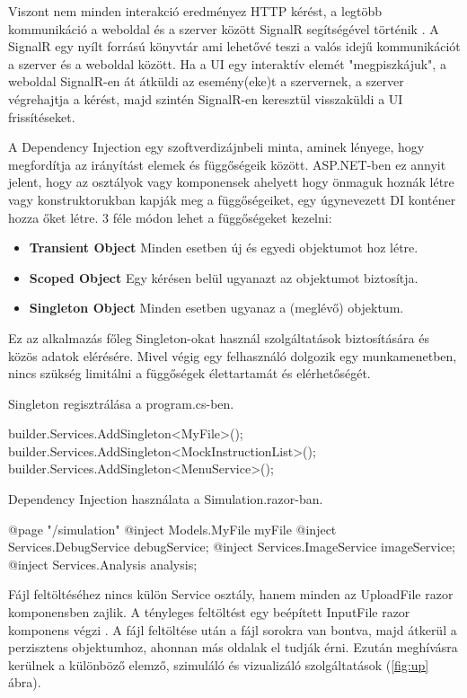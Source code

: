 Viszont nem minden interakció eredményez HTTP kérést, a legtöbb kommunikáció a weboldal és a szerver között SignalR segítségével történik \cite{signalr}. A SignalR egy nyílt forrású könyvtár ami lehetővé teszi a valós idejű kommunikációt a szerver és a weboldal között. Ha a UI egy interaktív elemét "megpiszkájuk", a weboldal SignalR-en át átküldi az esemény(eke)t a szervernek, a szerver végrehajtja a kérést, majd szintén SignalR-en keresztül visszaküldi a UI frissítéseket.

A Dependency Injection \cite{di} egy szoftverdizájnbeli minta, aminek lényege, hogy megfordítja az irányítást elemek és függőségeik között. ASP.NET-ben ez annyit jelent, hogy az osztályok vagy komponensek ahelyett hogy önmaguk hoznák létre vagy konstruktorukban kapják meg a függőségeiket, egy úgynevezett DI konténer hozza őket létre. 3 féle módon lehet a függőségeket kezelni:
\begin{itemize}
\item\textbf{Transient Object} Minden esetben új és egyedi objektumot hoz létre.
\item\textbf{Scoped Object} Egy kérésen belül ugyanazt az objektumot biztosítja.
\item\textbf{Singleton Object} Minden esetben ugyanaz a (meglévő) objektum.
\end{itemize}
Ez az alkalmazás főleg Singleton-okat használ szolgáltatások biztosítására és közös adatok elérésére. Mivel végig egy felhasználó dolgozik egy munkamenetben, nincs szükség limitálni a függőségek élettartamát és elérhetőségét.

Singleton regisztrálása a program.cs-ben.
\begin{cpp}
builder.Services.AddSingleton<MyFile>();
builder.Services.AddSingleton<MockInstructionList>();
builder.Services.AddSingleton<MenuService>();
\end{cpp}

Dependency Injection használata a Simulation.razor-ban.
\begin{cpp}
@page "/simulation"
@inject Models.MyFile myFile
@inject Services.DebugService debugService;
@inject Services.ImageService imageService;
@inject Services.Analysis analysis;
\end{cpp}

Fájl feltöltéséhez nincs külön Service osztály, hanem minden az UploadFile razor komponensben zajlik. A tényleges feltöltést egy beépített InputFile razor komponens végzi \cite{upload}. A fájl feltöltése után a fájl sorokra van bontva, majd átkerül a perzisztens objektumhoz, ahonnan más oldalak el tudják érni. Ezután meghívásra kerülnek a különböző elemző, szimuláló és vizualizáló szolgáltatások (\ref{fig:up} ábra).

